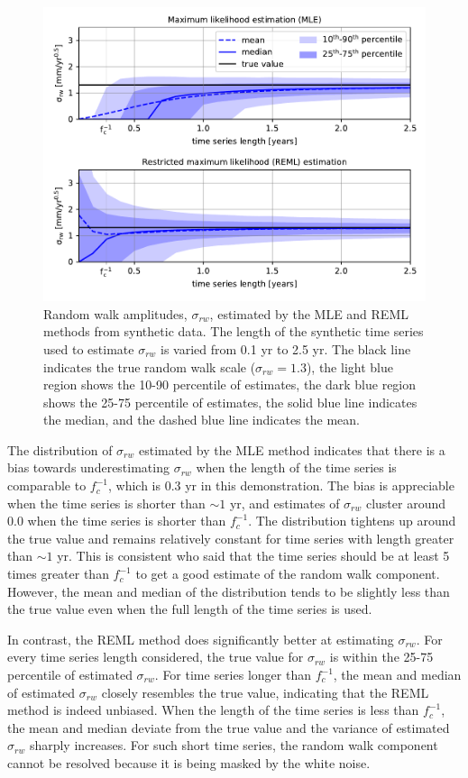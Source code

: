 \documentclass{svjour3}                     %
\begin{document}
\begin{figure}
\includegraphics{figure_1.pdf}
\caption{Random walk amplitudes, $\sigma_{rw}$, estimated by the MLE and REML methods from synthetic data. The length of the synthetic time series used to estimate $\sigma_{rw}$ is varied from 0.1 yr to 2.5 yr. The black line indicates the true random walk scale ($\sigma_{rw}=1.3$), the light blue region shows the 10-90 percentile of estimates, the dark blue region shows the 25-75 percentile of estimates, the solid blue line indicates the median, and the dashed blue line indicates the mean.}   
\label{fig:1}
\end{figure}

The distribution of $\sigma_{rw}$ estimated by the MLE method indicates that there is a bias towards underestimating $\sigma_{rw}$ when the length of the time series is comparable to $f_c^{-1}$, which is 0.3 yr in this demonstration. The bias is appreciable when the time series is shorter than ${\sim}1$ yr, and estimates of $\sigma_{rw}$ cluster around 0.0 when the time series is shorter than $f_c^{-1}$. The distribution tightens up around the true value and remains relatively constant for time series with length greater than ${\sim}1$ yr. This is consistent \citet{Langbein1997} who said that the time series should be at least 5 times greater than $f_c^{-1}$ to get a good estimate of the random walk component. However, the mean and median of the distribution tends to be slightly less than the true value even when the full length of the time series is used.

In contrast, the REML method does significantly better at estimating $\sigma_{rw}$. For every time series length considered, the true value for $\sigma_{rw}$ is within the 25-75 percentile of estimated $\sigma_{rw}$. For time series longer than $f_c^{-1}$, the mean and median of estimated $\sigma_{rw}$ closely resembles the true value, indicating that the REML method is indeed unbiased. When the length of the time series is less than $f_c^{-1}$, the mean and median deviate from the true value and the variance of estimated $\sigma_{rw}$ sharply increases. For such short time series, the random walk component cannot be resolved because it is being masked by the white noise.
\end{document}
